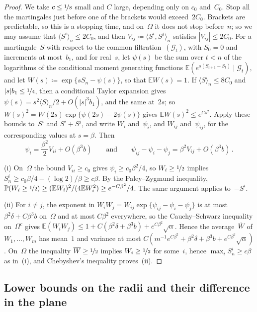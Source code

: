 \documentclass[11pt]{amsart}
\theoremstyle{plain}
\theoremstyle{definition}
\renewcommand{\P}{\mathbb P}
\newcommand{\E}{\mathbb E}
\newcommand{\nf}{\nicefrac}
\numberwithin{equation}{section}
\begin{document}
\begin{proof}
We take $c\leq\nf18$ small and $C$ large, depending only on $c_0$ and~$C_0$. Stop all the martingales just before one of the brackets would exceed~$2C_0$. Brackets are predictable, so this is a stopping time, and on~$\Omega$ it does not stop before~$n$; so we may assume that $\langle S^i\rangle_n\leq2C_0$, and then $V_{ij}\coloneqq\langle S^i,S^j\rangle_n$ satisfies $|V_{ij}|\leq2C_0$. For a martingale~$S$ with respect to the common filtration~$(\mathcal G_t)$, with $S_0=0$ and increments at most~$b_1$, and for real~$s$, let $\psi(s)$ be the sum over $t<n$ of the logarithms of the conditional moment generating functions $\E(e^{s(S_{t+1}-S_t)}\mid\mathcal G_t)$, and let $W(s)\coloneqq\exp\{sS_n-\psi(s)\}$, so that $\E W(s)=1$. If $\langle S\rangle_n\leq8C_0$ and $|s|b_1\leq\nf14$, then a conditional Taylor expansion gives $\psi(s)=s^2\langle S\rangle_n/2+O(|s|^3b_1)$, and the same at~$2s$; so $W(s)^2=W(2s)\exp\{\psi(2s)-2\psi(s)\}$ gives $\E W(s)^2\leq e^{Cs^2}$. Apply these bounds to~$S^i$ and $S^i+S^j$, and write $W_i$ and~$\psi_i$, and $W_{ij}$ and~$\psi_{ij}$, for the corresponding values at $s=\beta$. Then
\begin{equation*}
\psi_i=\frac{\beta^2}2V_{ii}+O(\beta^3b)
\qquad\text{and}\qquad
\psi_{ij}-\psi_i-\psi_j=\beta^2V_{ij}+O(\beta^3b)\, .
\end{equation*}

(i) On~$\Omega$ the bound $V_{ii}\geq c_0$ gives $\psi_i\geq c_0\beta^2/4$, so $W_i\geq\nf12$ implies $S^i_n\geq c_0\beta/4-(\log 2)/\beta\geq c\beta$. By the Paley--Zygmund inequality, $\P(W_i\geq\nf12)\geq(\E W_i)^2/(4\E W_i^2)\geq e^{-C\beta^2}/4$. The same argument applies to~$-S^i$.

(ii) For $i\neq j$, the exponent in $W_iW_j=W_{ij}\exp\{\psi_{ij}-\psi_i-\psi_j\}$ is at most $\beta^2\delta+C\beta^3b$ on~$\Omega$ and at most $C\beta^2$ everywhere, so the Cauchy--Schwarz inequality on~$\Omega^c$ gives $\E(W_iW_j)\leq1+C(\beta^2\delta+\beta^3b)+e^{C\beta^2}\sqrt\alpha$. Hence the average~$\overline W$ of $W_1,\ldots,W_m$ has mean~$1$ and variance at most $C(m^{-1}e^{C\beta^2}+\beta^2\delta+\beta^3b+e^{C\beta^2}\sqrt\alpha)$. On~$\Omega$ the inequality $\overline W\geq\nf12$ implies $W_i\geq\nf12$ for some~$i$, hence $\max_iS^i_n\geq c\beta$ as in~(i), and Chebyshev's inequality proves~(ii).
\end{proof}

\subsection{Lower bounds on the radii and their difference in the plane}
\end{document}
